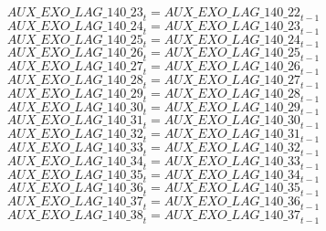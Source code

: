 \begin{dmath}
{AUX\_EXO\_LAG\_140\_23}_{t}={AUX\_EXO\_LAG\_140\_22}_{t-1}
\end{dmath}
\begin{dmath}
{AUX\_EXO\_LAG\_140\_24}_{t}={AUX\_EXO\_LAG\_140\_23}_{t-1}
\end{dmath}
\begin{dmath}
{AUX\_EXO\_LAG\_140\_25}_{t}={AUX\_EXO\_LAG\_140\_24}_{t-1}
\end{dmath}
\begin{dmath}
{AUX\_EXO\_LAG\_140\_26}_{t}={AUX\_EXO\_LAG\_140\_25}_{t-1}
\end{dmath}
\begin{dmath}
{AUX\_EXO\_LAG\_140\_27}_{t}={AUX\_EXO\_LAG\_140\_26}_{t-1}
\end{dmath}
\begin{dmath}
{AUX\_EXO\_LAG\_140\_28}_{t}={AUX\_EXO\_LAG\_140\_27}_{t-1}
\end{dmath}
\begin{dmath}
{AUX\_EXO\_LAG\_140\_29}_{t}={AUX\_EXO\_LAG\_140\_28}_{t-1}
\end{dmath}
\begin{dmath}
{AUX\_EXO\_LAG\_140\_30}_{t}={AUX\_EXO\_LAG\_140\_29}_{t-1}
\end{dmath}
\begin{dmath}
{AUX\_EXO\_LAG\_140\_31}_{t}={AUX\_EXO\_LAG\_140\_30}_{t-1}
\end{dmath}
\begin{dmath}
{AUX\_EXO\_LAG\_140\_32}_{t}={AUX\_EXO\_LAG\_140\_31}_{t-1}
\end{dmath}
\begin{dmath}
{AUX\_EXO\_LAG\_140\_33}_{t}={AUX\_EXO\_LAG\_140\_32}_{t-1}
\end{dmath}
\begin{dmath}
{AUX\_EXO\_LAG\_140\_34}_{t}={AUX\_EXO\_LAG\_140\_33}_{t-1}
\end{dmath}
\begin{dmath}
{AUX\_EXO\_LAG\_140\_35}_{t}={AUX\_EXO\_LAG\_140\_34}_{t-1}
\end{dmath}
\begin{dmath}
{AUX\_EXO\_LAG\_140\_36}_{t}={AUX\_EXO\_LAG\_140\_35}_{t-1}
\end{dmath}
\begin{dmath}
{AUX\_EXO\_LAG\_140\_37}_{t}={AUX\_EXO\_LAG\_140\_36}_{t-1}
\end{dmath}
\begin{dmath}
{AUX\_EXO\_LAG\_140\_38}_{t}={AUX\_EXO\_LAG\_140\_37}_{t-1}
\end{dmath}
